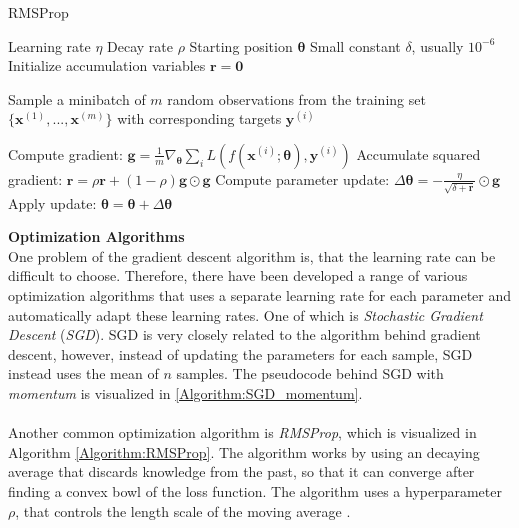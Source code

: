 \documentclass[./main.tex]{subfiles}
\begin{document}
\begin{algorithm}[htbp]
    \caption{RMSProp \cite{DeepLearning}}
    \label{Algorithm:RMSProp}
    \begin{algorithmic}[1]
        \Require Learning rate $\eta$
        \Require Decay rate $\rho$
        \Require Starting position $\bm{\theta}$
        \Require Small constant $\delta$, usually $10^{-6}$
        \State Initialize accumulation variables $\bm{r} = \bm{0}$
            \State \begin{varwidth}[t]{\linewidth}
            Sample a minibatch of $m$ random observations from the training set $\{\bm{x}^{(1)}, ..., \bm{x}^{(m)}\}$ with corresponding targets $\bm{y}^{(i)}$
            \end{varwidth}
            \State Compute gradient: $\bm{g} = \frac{1}{m} \nabla_{\bm{\theta}} \sum_i L\left( f \left(\bm{x}^{(i)}; \bm{\theta} \right), \bm{y}^{(i)} \right)$
            \State Accumulate squared gradient: $\bm{r} = \rho \bm{r} + (1 - \rho) \bm{g} \odot \bm{g}$
            \State Compute parameter update: $\Delta\bm{\theta} = - \frac{\eta}{\sqrt{\delta + \bm{r}}} \odot \bm{g}$
            \State Apply update: $\bm{\theta} = \bm{\theta} + \Delta \bm{\theta}$ 
        \EndWhile
    \end{algorithmic}
\end{algorithm}
\noindent \textbf{Optimization Algorithms} \\
\noindent One problem of the gradient descent algorithm is, that the learning rate can be difficult to choose. Therefore, there have been developed a range of various optimization algorithms that uses a separate learning rate for each parameter and automatically adapt these learning rates. One of which is \textit{Stochastic Gradient Descent} (\textit{SGD}). SGD is very closely related to the algorithm behind gradient descent, however, instead of updating the parameters for each sample, SGD instead uses the mean of $n$ samples. The pseudocode behind SGD with \textit{momentum} is visualized in \ref{Algorithm:SGD_momentum}.
\\
\\
Another common optimization algorithm is \textit{RMSProp}, which is visualized in Algorithm \ref{Algorithm:RMSProp}. The algorithm works by using an decaying average that discards knowledge from the past, so that it can converge after finding a convex bowl of the loss function. The algorithm uses a hyperparameter $\rho$, that controls the length scale of the moving average \cite{DeepLearning}.
\end{document}
